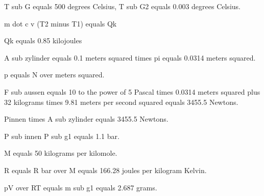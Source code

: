 T sub G equals 500 degrees Celsius, T sub G2 equals 0.003 degrees Celsius.

m dot c v (T2 minus T1) equals Qk

Qk equals 0.85 kilojoules

A sub zylinder equals 0.1 meters squared times pi equals 0.0314 meters squared.

p equals N over meters squared.

F sub aussen equals 10 to the power of 5 Pascal times 0.0314 meters squared plus 32 kilograms times 9.81 meters per second squared equals 3455.5 Newtons.

Pinnen times A sub zylinder equals 3455.5 Newtons.

P sub innen P sub g1 equals 1.1 bar.

M equals 50 kilograms per kilomole.

R equals R bar over M equals 166.28 joules per kilogram Kelvin.

pV over RT equals m sub g1 equals 2.687 grams.